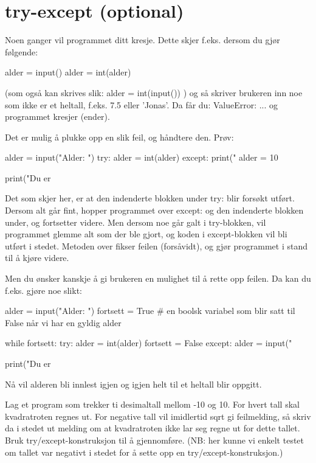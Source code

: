 {\section{try-except (optional)}

Noen ganger vil programmet ditt kresje. Dette skjer f.eks. dersom du gjør følgende:
\begin{usncodebox}
alder = input()
alder = int(alder)
\end{usncodebox}

(som også kan skrives slik: alder = int(input()) ) og så skriver brukeren inn noe som ikke er et heltall, f.eks. 7.5 eller 'Jonas'. Da får du: ValueError: ... og programmet kresjer (ender). 

Det er mulig å plukke opp en slik feil, og håndtere den. 
Prøv:
\begin{usncodebox}
alder = input("Alder: ")
try:
    alder = int(alder)
except:
    print("%
    alder = 10 

print("Du er %
\end{usncodebox}
    
Det som skjer her, er at den indenderte blokken under try: blir forsøkt utført. Dersom alt går fint, hopper programmet over except: og den indenderte blokken under, og fortsetter videre. Men dersom noe går galt i try-blokken, vil programmet glemme alt som der ble gjort, og koden i except-blokken vil bli utført i stedet. Metoden over fikser feilen (forsåvidt), og gjør programmet i stand til å kjøre videre. 

Men du ønsker kanskje å gi brukeren en mulighet til å rette opp feilen. Da kan du f.eks. gjøre noe slikt:

\begin{usncodebox}
alder = input("Alder: ")
fortsett = True     # en boolsk variabel som blir satt til False når vi har en gyldig alder

while fortsett: 
    try:
        alder = int(alder)
        fortsett = False
    except:
        alder = input("%

print("Du er %
\end{usncodebox}

Nå vil alderen bli innlest igjen og igjen helt til et heltall blir oppgitt. 

\begin{question}
Lag et program som trekker ti desimaltall mellom -10 og 10. For hvert tall skal kvadratroten regnes ut.
For negative tall vil imidlertid sqrt gi feilmelding, så skriv da i stedet ut melding om at kvadratroten ikke lar seg regne ut for dette tallet. Bruk try/except-konstruksjon til å gjennomføre. (NB: her kunne vi enkelt testet om tallet var negativt i stedet for å sette opp en try/except-konstruksjon.)
\end{question}

}

